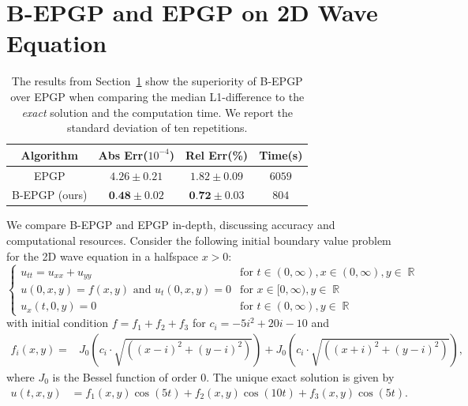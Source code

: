 \documentclass{article} %
\theoremstyle{plain}
\theoremstyle{definition}
\theoremstyle{remark}
\DeclareMathOperator*{\R}{\mathbb{R}}
\begin{document}
\section{B-EPGP and EPGP on 2D Wave Equation}\label{sec:comparison_epgp}

\begin{table}

\caption{The results from Section~\ref{sec:comparison_epgp} show the superiority of B-EPGP over EPGP when comparing the median L1-difference to the \textit{exact} solution and the computation time. We report the standard deviation of ten repetitions.}
\label{table:comparison}
\centering
\begin{tabular}{|c||c|c|c|}
\hline
Algorithm & Abs Err(\(10^{-4}\)) & Rel Err(\%) & Time(s) \\
\hline
\small{EPGP} & $4.26 \pm 0.21$ & $1.82 \pm 0.09$ & $6059$\\
\small{B-EPGP (ours)} & $\textbf{0.48} \pm 0.02$ & $\textbf{0.72} \pm 0.03$ & $804$\\
\hline
\end{tabular}
\end{table}

We compare  B-EPGP and EPGP in-depth, discussing accuracy and computational resources.
Consider the following initial boundary value problem for the 2D wave equation in a halfspace $x>0$:
\[
\begin{cases}
    u_{tt}=u_{xx}+u_{yy}
    &\text{for \(t\in(0,\infty), x\in(0,\infty), y\in\R\)}\\
    u(0,x,y)=f(x,y) \text{ and } u_t(0,x,y)=0
    &\text{for \(x\in[0,\infty),y\in\R\)}\\
    u_x(t,0,y)=0 &\text{for \(t\in(0,\infty), y\in\R\)}
\end{cases}
\]
with initial condition $f=f_1+f_2+f_3$ for $c_i=-5i^2+20i-10$ and
\begin{align*}
    f_i(x,y)=&J_0(c_i\cdot\sqrt{((x-i)^2+(y-i)^2)})+J_0(c_i\cdot\sqrt{((x+i)^2+(y-i)^2)}),
\end{align*}
where \(J_0\) is the Bessel function of order \(0\).
The unique exact solution is given by
\begin{align*}
u(t,x,y)&=f_1(x,y)\cos(5t)+f_2(x,y)\cos(10t)+f_3(x,y)\cos(5t).
\end{align*}
\end{document}
